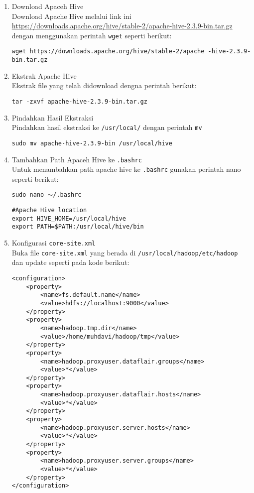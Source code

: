 \documentclass[a4paper]{tufte-handout}
\begin{document}
\begin{enumerate}
\item Download Apaceh Hive \\
Download Apache Hive melalui link ini \url{https://downloads.apache.org/hive/stable-2/apache-hive-2.3.9-bin.tar.gz} dengan menggunakan perintah {\tt wget} seperti berikut:

{\tt wget https://downloads.apache.org/hive/stable-2/apache -hive-2.3.9-bin.tar.gz}

\item Ekstrak Apache Hive \\
Ekstrak file yang telah didownload dengna perintah berikut:

{\tt tar -zxvf apache-hive-2.3.9-bin.tar.gz}

\item Pindahkan Hasil Ekstraksi \\
Pindahkan hasil ekstraksi ke {\tt /usr/local/} dengan perintah {\tt mv}

{\tt sudo mv apache-hive-2.3.9-bin /usr/local/hive}

\item Tambahkan Path Apaceh Hive ke {\tt .bashrc} \\
Untuk menambahkan path apache hive ke {\tt .bashrc} gunakan perintah nano
seperti berikut:

{\tt sudo nano $\sim$/.bashrc}

\begin{lstlisting}
#Apache Hive location
export HIVE_HOME=/usr/local/hive
export PATH=$PATH:/usr/local/hive/bin
\end{lstlisting}

\item Konfigurasi {\tt core-site.xml} \\
Buka file {\tt core-site.xml} yang berada di {\tt /usr/local/hadoop/etc/hadoop} dan update seperti pada kode berikut:

\begin{lstlisting}
<configuration>
	<property>
		<name>fs.default.name</name>
		<value>hdfs://localhost:9000</value>
	</property>
	<property>
		<name>hadoop.tmp.dir</name>
		<value>/home/muhdavi/hadoop/tmp</value>
	</property>
	<property>
		<name>hadoop.proxyuser.dataflair.groups</name>
		<value>*</value>
	</property>
	<property>
		<name>hadoop.proxyuser.dataflair.hosts</name>
		<value>*</value>
	</property>
	<property>
		<name>hadoop.proxyuser.server.hosts</name>
		<value>*</value>
	</property>
	<property>
		<name>hadoop.proxyuser.server.groups</name>
		<value>*</value>
	</property>
</configuration>
\end{lstlisting}


\end{enumerate}
\end{document}
